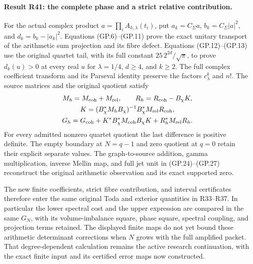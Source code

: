 \paragraph{Result R41: the complete phase and a strict relative contribution.}
For the actual complex product $a=\prod_i A_{h,\lambda}(t_i)$,
put $a_k=C_\Sigma a$, $b_k=C_\Sigma|a|^2$, and
$d_k=b_k-|a_k|^2$. Equations (GP.6)--(GP.11) prove the exact
unitary transport of the arithmetic sum projection and its fibre
defect. Equations (GP.12)--(GP.13) use the original quartet
tail, with its full constant $25\,2^{2d}/\sqrt\pi$, to prove
$d_k(u)>0$ at every real $u$ for $\lambda=1/4$, $d\geq4$,
and $k\geq2$. The full complex coefficient transform and its
Parseval identity preserve the factors $c_\lambda^k$ and $n!$.
The source matrices and the original quotient satisfy
\begin{gather*}
 M_h=M_{\rm coh}+M_{\rm rel},\qquad
 R_h=R_{\rm coh}-B_\chi K,\\
 K=(B_\chi^*M_hB_\chi)^{-1}B_\chi^*M_{\rm rel}R_{\rm coh},\\
 G_h=G_{\rm coh}+K^*B_\chi^*M_{\rm coh}B_\chi K
                            +R_h^*M_{\rm rel}R_h.
\end{gather*}
For every admitted nonzero quartet quotient the last difference
is positive definite. The empty boundary at $N=q-1$ and zero
quotient at $q=0$ retain their explicit separate values. The
graph-to-source addition, gamma multiplication, inverse Mellin
map, and full jet unit in (GP.24)--(GP.27) reconstruct the
original arithmetic observation and its exact supported zero.

The new finite coefficients, strict fibre contribution, and interval
certificates therefore enter the same original Toda and exterior
quantities in R33--R37. In particular the lower spectral cost and
the upper expression are compared in the same $G_N$, with its
volume-imbalance square, phase square, spectral coupling, and
projection terms retained. The displayed finite maps do not yet
bound these arithmetic determinant corrections when $N$ grows
with the full amplified packet. That degree-dependent calculation
remains the active research continuation, with the exact finite
input and its certified error maps now constructed.

